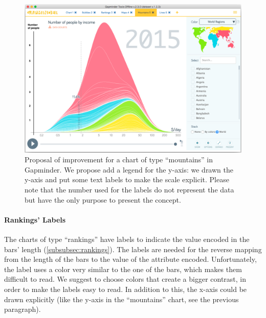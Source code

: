 \begin{figure}[h]
	\centering
	\includegraphics[width=0.95\columnwidth]{figures/mountains-y-legend}
	\caption{Proposal of improvement for a chart of type ``mountains'' in Gapminder. We propose add a legend for the y-axis: we drawn the y-axis and put some text labels to make the scale explicit. Please note that the number used for the labels do not represent the data but have the only purpose to present the concept.}
	\label{fig:mountains-y-legend}
\end{figure}

\paragraph{Rankings' Labels}
The charts of type ``rankings'' have labels to indicate the value encoded in the bars' length (\cref{subsubsec:rankings}).
The labels are needed for the reverse mapping from the length of the bars to the value of the attribute encoded.
Unfortunately, the label uses a color very similar to the one of the bars, which makes them difficult to read.
We suggest to choose colors that create a bigger contrast, in order to make the labels easy to read.
In addition to this, the x-axis could be drawn explicitly (like the y-axis in the ``mountains'' chart, see the previous paragraph).

